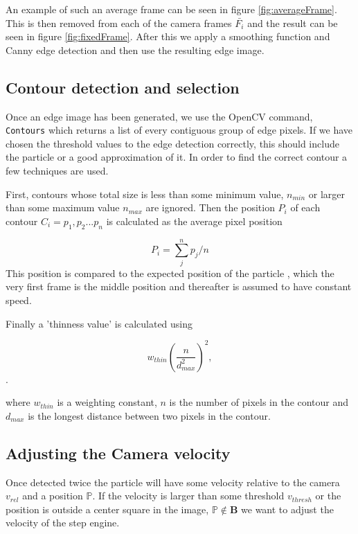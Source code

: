 An example of such an average frame can be seen in figure \ref{fig:averageFrame}. This is then removed from each of the camera frames $\bar{F_i}$ and the result can be seen in figure \ref{fig:fixedFrame}. After this we apply a smoothing function and Canny edge detection \cite{Canny} and then use the resulting edge image. 

\subsection{Contour detection and selection}

Once an edge image has been generated, we use the OpenCV command, \texttt{Contours} which returns a list of every contiguous group of edge pixels. If we have chosen the threshold values to the edge detection correctly, this should include the particle or a good approximation of it. 
In order to find the correct contour  a few techniques are used.

First, contours whose total size is less than some minimum value, $ n_{min}$ or larger than some maximum value $n_{max}$ are ignored. Then the position $P_i$ of each contour $C_i={p_1,p_2...p_n}$ is calculated as the average pixel position

\[
P_i = \sum_{j}^n p_j/n
\]
This position is compared to the expected position of the particle , which the very first frame is the middle position and thereafter is assumed to have constant speed. 

Finally a 'thinness value' is calculated using

\begin{equation}\label{eq:thinness}
w_{thin}\left(\frac{ n}{d_{max}^2}\right)^2,
\end{equation}. 

where $w_{thin}$ is a weighting constant, $n$ is the number of pixels in the contour and $d_{max}$ is the longest distance between two pixels in the contour.

\subsection{Adjusting the Camera velocity}
Once detected twice the particle will have some velocity relative to the camera $v_{rel}$ and a position $\mathbb{P}$. 
If the velocity is larger than some threshold $v_{thresh}$ or the position is outside a center square in the image, $\mathbb{P} \not \in \mathbf{B}$ we want to adjust the velocity of the step engine. 

